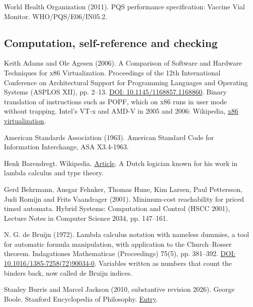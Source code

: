 \documentclass[11pt,twoside]{article}
\theoremstyle{thielethm}
\theoremstyle{thieledef}
\theoremstyle{thieledef}
\theoremstyle{thieledef}
\theoremstyle{thielethm}
\theoremstyle{thieleobs}
\theoremstyle{thielethm}
\begin{document}
\noindent World Health Organization (2011). PQS performance specification: Vaccine Vial Monitor. WHO/PQS/E06/IN05.2.
\par\medskip

\subsection{Computation, self-reference and checking}



\noindent Keith Adams and Ole Agesen (2006). A Comparison of Software and Hardware Techniques for x86 Virtualization. Proceedings of the 12th International Conference on Architectural Support for Programming Languages and Operating Systems (ASPLOS XII), pp. 2--13. \href{https://doi.org/10.1145/1168857.1168860}{DOI: 10.1145/1168857.1168860}. Binary translation of instructions such as POPF, which on x86 runs in user mode without trapping. Intel's VT-x and AMD-V in 2005 and 2006: Wikipedia, \href{https://en.wikipedia.org/wiki/X86_virtualization}{x86 virtualization}.
\par\medskip

\noindent American Standards Association (1963). American Standard Code for Information Interchange, ASA X3.4-1963.
\par\medskip

\noindent Henk Barendregt. Wikipedia. \href{https://en.wikipedia.org/wiki/Henk_Barendregt}{Article}. A Dutch logician known for his work in lambda calculus and type theory.
\par\medskip

\noindent Gerd Behrmann, Ansgar Fehnker, Thomas Hune, Kim Larsen, Paul Pettersson, Judi Romijn and Frits Vaandrager (2001). Minimum-cost reachability for priced timed automata. Hybrid Systems: Computation and Control (HSCC 2001), Lecture Notes in Computer Science 2034, pp. 147--161.
\par\medskip

\noindent N. G. de Bruijn (1972). Lambda calculus notation with nameless dummies, a tool for automatic formula manipulation, with application to the Church--Rosser theorem. Indagationes Mathematicae (Proceedings) 75(5), pp. 381--392. \href{https://doi.org/10.1016/1385-7258(72)90034-0}{DOI: 10.1016/1385-7258(72)90034-0}. Variables written as numbers that count the binders back, now called de Bruijn indices.
\par\medskip

\noindent Stanley Burris and Marcel Jackson (2010, substantive revision 2026). George Boole. Stanford Encyclopedia of Philosophy. \href{https://plato.stanford.edu/entries/boole/}{Entry}.
\par\medskip
\end{document}
